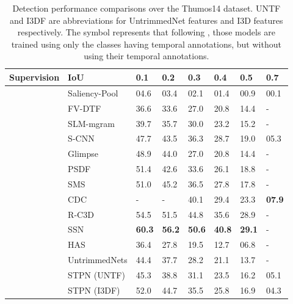 \documentclass[runningheads]{llncs}
\begin{document}
\begin{table}[h!]
	\fontsize{8.5}{9.5}\selectfont
	\centering	
	\caption{Detection performance comparisons over the Thumos14 dataset. UNTF and I3DF are abbreviations for UntrimmedNet features and I3D features respectively. The symbol  represents that following \cite{nguyen2017weakly}, those models are trained using only the  classes having temporal annotations, but without using their temporal annotations.}
	\begin{tabular}{C{1.9cm} || p{2.8cm} || C{1cm} C{1cm}  C{1cm}  C{1cm}  C{1cm} C{1cm}}
		\hline
		{Supervision} & {IoU } & {0.1} & {0.2} & {0.3} & {0.4} & {0.5} & {0.7}\\
		\hline \hline
		{} & {Saliency-Pool \cite{karaman2014fast}} & {04.6} & {03.4} & {02.1} & {01.4} & {00.9} & {00.1}\\
& {FV-DTF \cite{oneata2014lear}} & {36.6} & {33.6} & {27.0} & {20.8} & {14.4} & {-}\\
& {SLM-mgram \cite{richard2016temporal}} & {39.7} & {35.7} & {30.0} & {23.2} & {15.2} & {-}\\
& {S-CNN \cite{shou2016temporal}} & {47.7} & {43.5} & {36.3} & {28.7} & {19.0} & {05.3}\\
& {Glimpse \cite{yeung2016end}} & {48.9} & {44.0} & {27.0} & {20.8} & {14.4} & {-}\\
		& {PSDF \cite{yuan2016temporal}} & {51.4} & {42.6} & {33.6} & {26.1} & {18.8} & {-}\\
		& {SMS \cite{yuan2017temporal}} & {51.0} & {45.2} & {36.5} & {27.8} & {17.8} & {-}\\
		& {CDC \cite{shou2017cdc}} & {-} & {-} & {40.1} & {29.4} & {23.3} & {\textbf{07.9}}\\
& {R-C3D \cite{xu2017r}} & {54.5} & {51.5} & {44.8} & {35.6} & {28.9} & {-}\\	
		& {SSN \cite{zhao2017temporal}} & {\textbf{60.3}} & {\textbf{56.2}} & {\textbf{50.6}} & {\textbf{40.8}} & {\textbf{29.1}} & {-}\\	
		\hline
		\hline
		{} & {HAS \cite{singh2017hide}} & {36.4} & {27.8} & {19.5} & {12.7} & {06.8} & {-} \\
& {UntrimmedNets \cite{wang2017untrimmednets}} & {44.4} & {37.7} & {28.2} & {21.1} & {13.7} & {-}\\
		& {STPN (UNTF) \cite{nguyen2017weakly} } & {45.3} & {38.8} & {31.1} & {23.5} & {16.2} & {05.1}\\
		& {STPN (I3DF) \cite{nguyen2017weakly} } & {52.0} & {44.7} & {35.5} & {25.8} & {16.9} & {04.3}\\

\end{tabular}
\end{table}
\end{document}

